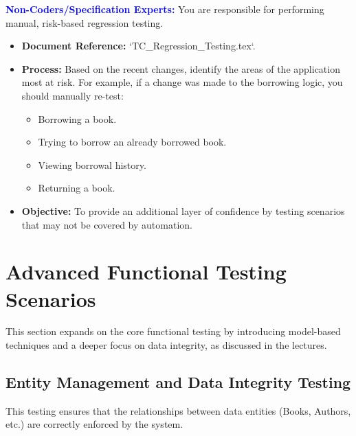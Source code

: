 \documentclass{article}
\newcommand{\role}[1]{\textbf{\textcolor{blue}{#1:}}}
\begin{document}
\role{Non-Coders/Specification Experts}
You are responsible for performing manual, risk-based regression testing.
\begin{itemize}
    \item \textbf{Document Reference:} `TC\_Regression\_Testing.tex`.
    \item \textbf{Process:} Based on the recent changes, identify the areas of the application most at risk. For example, if a change was made to the borrowing logic, you should manually re-test:
    \begin{itemize}
        \item Borrowing a book.
        \item Trying to borrow an already borrowed book.
        \item Viewing borrowal history.
        \item Returning a book.
    \end{itemize}
    \item \textbf{Objective:} To provide an additional layer of confidence by testing scenarios that may not be covered by automation.
\end{itemize}

\section{Advanced Functional Testing Scenarios}
This section expands on the core functional testing by introducing model-based techniques and a deeper focus on data integrity, as discussed in the lectures.

\subsection{Entity Management and Data Integrity Testing}
This testing ensures that the relationships between data entities (Books, Authors, etc.) are correctly enforced by the system.
\end{document}
